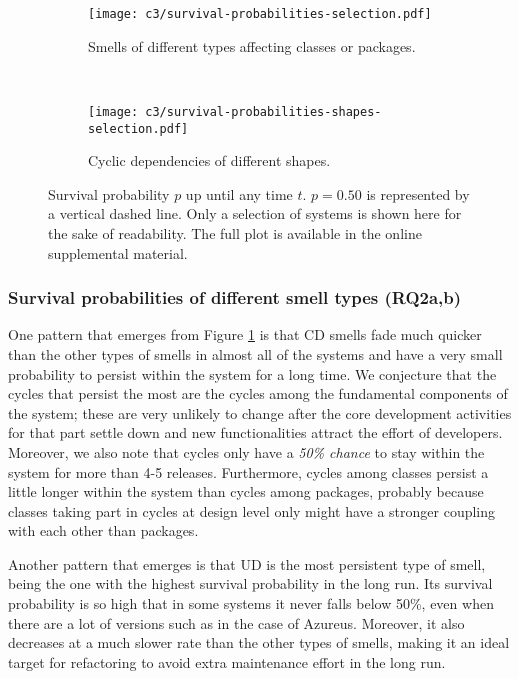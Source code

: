 \begin{figure}[!ht]
	\centering
    \begin{subfigure}[]{.7\textwidth}
        \centering
        \texttt{[image: c3/survival-probabilities-selection.pdf]}
        \caption{Smells of different types affecting classes or packages.}
        \label{c3:fig:survival-smells} 
    \end{subfigure} \hfill \\
    \begin{subfigure}[]{.7\textwidth}
        \centering
        \texttt{[image: c3/survival-probabilities-shapes-selection.pdf]}
        \caption{Cyclic dependencies of different shapes.}
        \label{c3:fig:survival-shapes} 
    \end{subfigure}
    \caption{Survival probability $p$ up until any time $t$. $p = 0.50$ is represented by a vertical dashed line. Only a selection of systems is shown here for the sake of readability. The full plot is available in the online supplemental material.}
    \label{c3:fig:survival}
\end{figure}

\subsubsection{Survival probabilities of different smell types (RQ2a,b)}
One pattern that emerges from Figure \ref{c3:fig:survival-smells} is that CD smells fade much quicker than the other types of smells in almost all of the systems and have a very small probability to persist within the system for a long time.
We conjecture that the cycles that persist the most are the cycles among the fundamental components of the system; these are very unlikely to change after the core development activities for that part settle down and new functionalities attract the effort of developers.
Moreover, we also note that cycles only have a \emph{50\% chance} to stay within the system for more than 4-5 releases. Furthermore, cycles among classes persist a little longer within the system than cycles among packages, probably because classes taking part in cycles at design level only might have a stronger coupling with each other than packages.

Another pattern that emerges is that UD is the most persistent type of smell, being the one with the highest survival probability in the long run.
Its survival probability is so high that in some systems it never falls below 50\%, even when there are a lot of versions such as in the case of Azureus.
Moreover, it also decreases at a much slower rate than the other types of smells, making it an ideal target for refactoring to avoid extra maintenance effort in the long run.

